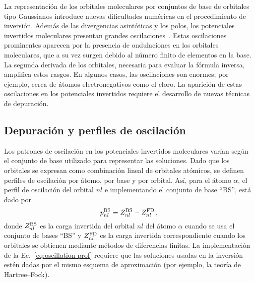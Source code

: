 La representación de los orbitales moleculares por conjuntos de base de 
orbitales tipo Gaussianos introduce nuevas dificultades numéricas en el 
procedimiento de inversión. Además de las divergencias asintóticas y los 
polos, los potenciales invertidos moleculares presentan grandes 
oscilaciones~\cite{Schipper:97,Jacob:11,Gaiduk:13}. Estas oscilaciones 
prominentes aparecen por la presencia de ondulaciones en los orbitales 
moleculares, que a su vez surgen debido al número finito de elementos en 
la base. La segunda derivada de los orbitales, necesaria para evaluar la 
fórmula inversa, amplifica estos rasgos. En algunos casos, las 
oscilaciones son enormes; por ejemplo, cerca de átomos electronegativos 
como el cloro. La aparición de estas oscilaciones en los potenciales 
invertidos requiere el desarrollo de nuevas técnicas de depuración.

\subsection{Depuración y perfiles de oscilación}
\label{sec:invmol}

Los patrones de oscilación en los potenciales invertidos moleculares 
varían según el conjunto de base utilizado para representar las 
soluciones. Dado que los orbitales se expresan como combinación lineal 
de orbitales atómicos, se definen perfiles de oscilación por átomo, por base y por orbital. Así, para el átomo $\alpha$, el perfil de oscilación
del orbital $nl$ e implementando el conjunto de base ``BS'', está dado 
por
\begin{equation}
 p_{nl}^{\mbox{\scriptsize BS}} = Z_{nl}^{\mbox{\scriptsize BS}}-
 Z_{nl}^{\mbox{\scriptsize FD}} \,,
 \label{eq:oscillation-prof}
\end{equation}
donde $Z_{nl}^{\mbox{\scriptsize BS}}$ es la carga invertida del orbital
$nl$ del átomo $\alpha$ cuando se usa el conjunto de bases ``BS'' y 
$Z_{nl}^{\mbox{\scriptsize FD}}$ es la carga invertida correspondiente 
cuando los orbitales se obtienen mediante métodos de diferencias 
finitas. La implementación de la Ec.~\ref{eq:oscillation-prof} requiere 
que las soluciones usadas en la inversión estén dadas por el mismo 
esquema de aproximación (por ejemplo, la teoría de Hartree--Fock).

